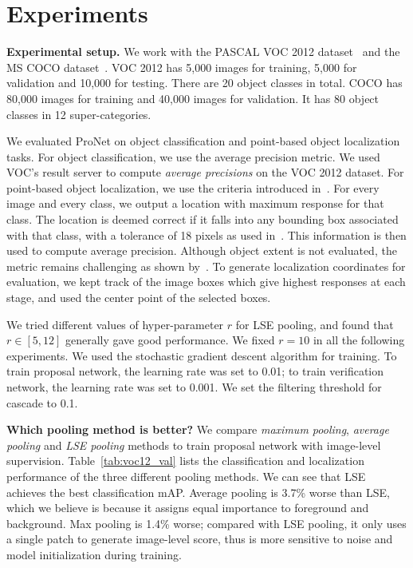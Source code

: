 \documentclass[10pt,twocolumn,letterpaper]{article}
\begin{document}
\section{Experiments}
\textbf{Experimental setup.} We work with the PASCAL VOC 2012 dataset~\cite{Everingham10} and the MS COCO dataset~\cite{DBLP:journals/corr/LinMBHPRDZ14}. VOC 2012 has 5,000 images for training, 5,000 for validation and 10,000 for testing. There are 20 object classes in total. COCO has 80,000 images for training and 40,000 images for validation. It has 80 object classes in 12 super-categories.

We evaluated ProNet on object classification and point-based object localization tasks. For object classification, we use the average precision metric. We used VOC's result server to compute \textit{average precisions} on the VOC 2012 dataset. For point-based object localization, we use the criteria introduced in~\cite{Oquab_2015_CVPR}. For every image and every class, we output a location with maximum response for that class. The location is deemed correct if it falls into any bounding box associated with that class, with a tolerance of 18 pixels as used in~\cite{Oquab_2015_CVPR}. This information is then used to compute average precision. Although object extent is not evaluated, the metric remains challenging as shown by~\cite{Oquab_2015_CVPR}. To generate localization coordinates for evaluation, we kept track of the image boxes which give highest responses at each stage, and used the center point of the selected boxes.

We tried different values of hyper-parameter $r$ for LSE pooling, and found that $r\in[5,12]$ generally gave good performance. We fixed $r=10$ in all the following experiments. We used the stochastic gradient descent algorithm for training. To train proposal network, the learning rate was set to 0.01; to train verification network, the learning rate was set to 0.001. We set the  filtering threshold for cascade to 0.1.

\textbf{Which pooling method is better?} We compare \textit{maximum pooling}, \textit{average pooling} and \textit{LSE pooling} methods to train proposal network with image-level supervision. Table~\ref{tab:voc12_val} lists the classification and localization performance of the three different pooling methods. We can see that LSE achieves the best classification mAP. Average pooling is 3.7\% worse than LSE, which we believe is because it assigns equal importance to foreground and background. Max pooling is 1.4\% worse; compared with LSE pooling, it only uses a single patch to generate image-level score, thus is more sensitive to noise and model initialization during training.
\end{document}
